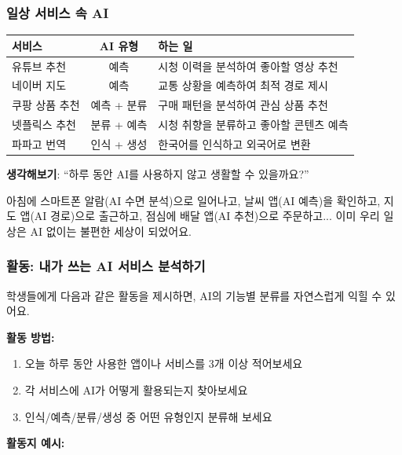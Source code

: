 \documentclass[11pt,a4paper]{article}
\begin{document}
\subsubsection{일상 서비스 속 AI}

\begin{center}
\begin{tabular}{|p{3.5cm}|c|p{6.5cm}|}
\hline
\rowcolor{tableheader}
\textbf{서비스} & \textbf{AI 유형} & \textbf{하는 일} \\
\hline
유튜브 추천 & 예측 & 시청 이력을 분석하여 좋아할 영상 추천 \\
\hline
네이버 지도 & 예측 & 교통 상황을 예측하여 최적 경로 제시 \\
\hline
쿠팡 상품 추천 & 예측 + 분류 & 구매 패턴을 분석하여 관심 상품 추천 \\
\hline
넷플릭스 추천 & 분류 + 예측 & 시청 취향을 분류하고 좋아할 콘텐츠 예측 \\
\hline
파파고 번역 & 인식 + 생성 & 한국어를 인식하고 외국어로 변환 \\
\hline
\end{tabular}
\end{center}

\begin{questionbox}
 \textbf{생각해보기}: ``하루 동안 AI를 사용하지 않고 생활할 수 있을까요?''

아침에 스마트폰 알람(AI 수면 분석)으로 일어나고, 날씨 앱(AI 예측)을 확인하고, 지도 앱(AI 경로)으로 출근하고, 점심에 배달 앱(AI 추천)으로 주문하고... 이미 우리 일상은 AI 없이는 불편한 세상이 되었어요.
\end{questionbox}

\subsubsection{활동: 내가 쓰는 AI 서비스 분석하기}

학생들에게 다음과 같은 활동을 제시하면, AI의 기능별 분류를 자연스럽게 익힐 수 있어요.

\textbf{활동 방법:}
\begin{enumerate}[leftmargin=*]
    \item 오늘 하루 동안 사용한 앱이나 서비스를 3개 이상 적어보세요
    \item 각 서비스에 AI가 어떻게 활용되는지 찾아보세요
    \item 인식/예측/분류/생성 중 어떤 유형인지 분류해 보세요
\end{enumerate}

\textbf{활동지 예시:}
\end{document}
